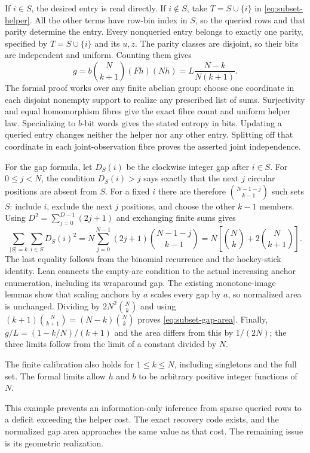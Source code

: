 \begin{outline}
If $i\in S$, the desired entry is read directly.  If $i\notin S$,
take $T=S\cup\{i\}$ in \cref{eq:subset-helper}.  All the other terms
have row-bin index in $S$, so the queried rows and that parity determine
the entry.  Every nonqueried entry belongs to exactly one parity,
specified by $T=S\cup\{i\}$ and its $u,z$.  The parity classes are
disjoint, so their bits are independent and uniform.  Counting them
gives
\[
 g=b\binom N{k+1}(Fh)(Nh)
   =L\frac{N-k}{N(k+1)}.
\]
The formal proof works over any finite abelian group: choose one
coordinate in each disjoint nonempty support to realize any prescribed
list of sums. Surjectivity and equal homomorphism fibres give the exact
fibre count and uniform helper law. Specializing to $b$-bit words gives
the stated entropy in bits. Updating a queried entry changes neither
the helper nor any other entry. Splitting off that coordinate in each
joint-observation fibre proves the asserted joint independence.

For the gap formula, let $D_S(i)$ be the clockwise integer gap after
$i\in S$. For $0\le j<N$, the condition $D_S(i)>j$ says exactly that
the next $j$ circular positions are absent from $S$. For a fixed $i$
there are therefore $\binom{N-1-j}{k-1}$ such sets $S$: include $i$,
exclude the next $j$ positions, and choose the other $k-1$ members.
Using $D^2=\sum_{j=0}^{D-1}(2j+1)$ and exchanging finite sums gives
\[
 \sum_{|S|=k}\sum_{i\in S}D_S(i)^2
 =N\sum_{j=0}^{N-1}(2j+1)\binom{N-1-j}{k-1}
 =N\left[\binom Nk+2\binom N{k+1}\right].
\]
The last equality follows from the binomial recurrence and the
hockey-stick identity. Lean connects the empty-arc condition to the
actual increasing anchor enumeration, including its wraparound gap.
The existing monotone-image lemmas show that scaling anchors by $a$
scales every gap by $a$, so normalized area is unchanged. Dividing by
$2N^2\binom Nk$ and using
$(k+1)\binom N{k+1}=(N-k)\binom Nk$ proves
\cref{eq:subset-gap-area}. Finally,
$g/L=(1-k/N)/(k+1)$ and the area differs from this by $1/(2N)$;
the three limits follow from the limit of a constant divided by $N$.
\end{outline}

The finite calibration also holds for $1\le k\le N$, including
singletons and the full set. The formal limits allow $h$ and $b$ to be
arbitrary positive integer functions of $N$.

This example prevents an information-only inference from sparse queried
rows to a deficit exceeding the helper cost.  The exact recovery code
exists, and the normalized gap area approaches the same value as that
cost.  The remaining issue is its geometric realization.

